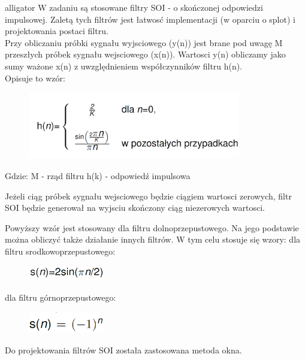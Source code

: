 \documentclass[12pt]{article}
\begin{document}
\begin{labeling}{alligator}
W zadaniu są stosowane filtry SOI - o skończonej odpowiedzi impulsowej. Zaletą tych filtrów jest łatwosć implementacji (w oparciu o splot) i projektowania postaci filtru. 
\\Przy obliczaniu próbki sygnału wyjsciowego (y(n)) jest brane pod uwagę M przeszłych próbek sygnału wejsciowego (x(n)). Wartosci y(n) obliczamy jako sumy ważone x(n) z uwzględnieniem współczynników filtru h(n). 
\\Opisuje to wzór:

\begin{figure}[h!]
 \centering
 \includegraphics[width=9.3cm]{filtrS.PNG}
 \vspace{-0.3cm}
 \label{Splot_indeks}
\end{figure}

Gdzie:
\subitem M - rząd filtru
\subitem h(k) - odpowiedź impulsowa

Jeżeli ciąg próbek sygnału wejsciowego będzie ciągiem wartosci zerowych,  filtr SOI będzie generował na wyjsciu skończony ciąg niezerowych wartosci.

Powyższy wzór jest stosowany dla filtru dolnoprzepustowego. Na jego podstawie można obliczyć także działanie innych filtrów. W tym celu stosuje się wzory:
\subsubitem dla filtru srodkowoprzepustowego:
\begin{figure}[h!]
 \centering
 \includegraphics[width=3.3cm]{sr.PNG}
 \vspace{-0.3cm}
 \label{Splot_indeks}
\end{figure}

\subsubitem dla filtru górnoprzepustowego:
\begin{figure}[h!]
 \centering
 \includegraphics[width=3.3cm]{gor.PNG}
 \vspace{-0.3cm}
 \label{Splot_indeks}
\end{figure}


Do projektowania filtrów SOI została zastosowana metoda okna.



\end{labeling}
\end{document}
